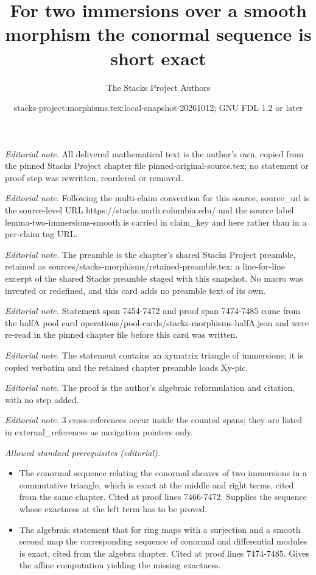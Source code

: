 \documentclass[10pt,a4paper]{amsart}
\title{For two immersions over a smooth morphism the conormal sequence is short exact}
\author{The Stacks Project Authors}
\date{stacks-project:morphisms.tex:local-snapshot-20261012; GNU FDL 1.2 or later}
\theoremstyle{plain}
\theoremstyle{definition}
\theoremstyle{remark}
\numberwithin{equation}{subsection}
\begin{document}
\maketitle
\noindent\textit{Editorial note.} All delivered mathematical text is the author's own, copied from the pinned Stacks Project chapter file pinned-original-source.tex; no statement or proof step was rewritten, reordered or removed.\par\medskip
\noindent\textit{Editorial note.} Following the multi-claim convention for this source, source\_url is the source-level URL https://stacks.math.columbia.edu/ and the source label lemma-two-immersions-smooth is carried in claim\_key and here rather than in a per-claim tag URL.\par\medskip
\noindent\textit{Editorial note.} The preamble is the chapter's shared Stacks Project preamble, retained as sources/stacks-morphisms/retained-preamble.tex: a line-for-line excerpt of the shared Stacks preamble staged with this snapshot. No macro was invented or redefined, and this card adds no preamble text of its own.\par\medskip
\noindent\textit{Editorial note.} Statement span 7454-7472 and proof span 7474-7485 come from the halfA pool card operations/pool-cards/stacks-morphisms-halfA.json and were re-read in the pinned chapter file before this card was written.\par\medskip
\noindent\textit{Editorial note.} The statement contains an xymatrix triangle of immersions; it is copied verbatim and the retained chapter preamble loads Xy-pic.\par\medskip
\noindent\textit{Editorial note.} The proof is the author's algebraic reformulation and citation, with no step added.\par\medskip
\noindent\textit{Editorial note.} 3 cross-references occur inside the counted spans; they are listed in external\_references as navigation pointers only.\par\medskip
\noindent\textit{Allowed standard prerequisites (editorial).}\begin{itemize}
\item The conormal sequence relating the conormal sheaves of two immersions in a commutative triangle, which is exact at the middle and right terms, cited from the same chapter. Cited at proof lines 7466-7472. Supplies the sequence whose exactness at the left term has to be proved.
\item The algebraic statement that for ring maps with a surjection and a smooth second map the corresponding sequence of conormal and differential modules is exact, cited from the algebra chapter. Cited at proof lines 7474-7485. Gives the affine computation yielding the missing exactness.
\end{itemize}\medskip
\end{document}
